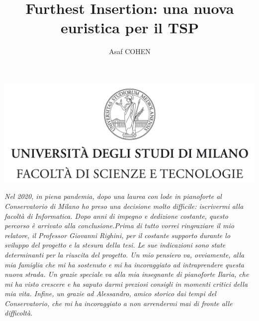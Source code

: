 \documentclass[a4paper,12pt]{report}
\begin{document}
\includegraphics{tesiSCIENZE_TECNOLOGIE.jpg}
\title{Furthest Insertion: una nuova euristica per il TSP}
\author{Asaf COHEN}
%
% 
%

\beforepreface

\clearpage
\null
\thispagestyle{empty}
\clearpage

{ \Large {\sl Nel 2020, in piena pandemia, dopo una laurea con lode in pianoforte al Conservatorio di Milano ho preso una decisione molto difficile: iscrivermi alla facoltà di Informatica. Dopo anni di impegno e dedizione costante, questo percorso è arrivato alla conclusione.\newline Prima di tutto vorrei ringraziare il mio relatore, il Professor Giovanni Righini, per il costante supporto durante lo sviluppo del progetto e la stesura della tesi. Le sue indicazioni sono state determinanti per la riuscita del progetto. \newline Un mio pensiero va, ovviamente, alla mia famiglia che mi ha sostenuto e mi ha incoraggiato ad intraprendere questa nuova strada. \newline Un grazie speciale va alla mia insegnante di pianoforte Ilaria, che mi ha visto crescere e ha saputo darmi preziosi consigli in momenti critici della mia vita. \newline Infine, un grazie ad Alessandro, amico storico dai tempi del Conservatorio, che mi ha incoraggiato a non arrendermi mai di fronte alle difficoltà.}}
% 
%
\end{document}

